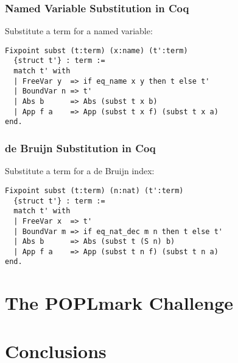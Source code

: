 \documentclass[notheorems]{beamer}
\begin{document}
\begin{frame}[fragile]

  \frametitle{Named Variable Substitution in Coq}

  Substitute a term for a named variable:
  \begin{lstlisting}
Fixpoint subst (t:term) (x:name) (t':term)
  {struct t'} : term :=
  match t' with
  | FreeVar y  => if eq_name x y then t else t'
  | BoundVar n => t'
  | Abs b      => Abs (subst t x b)
  | App f a    => App (subst t x f) (subst t x a)
end.
  \end{lstlisting}

\end{frame}


\begin{frame}[fragile]

  \frametitle{de Bruijn Substitution in Coq}

  Substitute a term for a de Bruijn index:
  \begin{lstlisting}
Fixpoint subst (t:term) (n:nat) (t':term)
  {struct t'} : term :=
  match t' with
  | FreeVar x  => t'
  | BoundVar m => if eq_nat_dec m n then t else t'
  | Abs b      => Abs (subst t (S n) b)
  | App f a    => App (subst t n f) (subst t n a)
end.
  \end{lstlisting}

\end{frame}


\section{The POPLmark Challenge}









\section{Conclusions}




\end{document}
